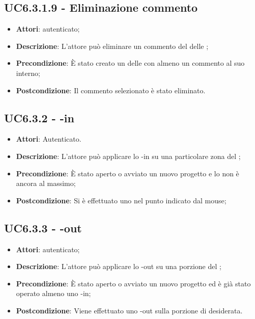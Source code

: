 \subsection{UC6.3.1.9 - Eliminazione commento}
\label{ssec:UC6.3.1.9}
\begin{itemize}
\item \textbf{Attori}:  autenticato;
\item \textbf{Descrizione}: L'attore può eliminare un commento del  delle ;
\item \textbf{Precondizione}: È stato creato un  delle  con almeno un commento al suo interno;
\item \textbf{Postcondizione}: Il commento selezionato è stato eliminato.
\end{itemize}
\subsection{UC6.3.2 - -in}
\label{ssec:UC6.3.2}
\begin{itemize}
\item \textbf{Attori}:  Autenticato.
\item \textbf{Descrizione}: L'attore può applicare lo -in su una particolare zona del ;
\item \textbf{Precondizione}: È stato aperto o avviato un nuovo progetto e lo  non è ancora al massimo;
\item \textbf{Postcondizione}: Si è effettuato uno  nel punto indicato dal mouse;
\end{itemize}
\subsection{UC6.3.3 - -out}
\label{ssec:UC6.3.3}
\begin{itemize}
\item \textbf{Attori}:  autenticato;
\item \textbf{Descrizione}: L'attore può applicare lo -out su una porzione del ;
\item \textbf{Precondizione}: È stato aperto o avviato un nuovo progetto ed è già stato operato almeno uno -in;
\item \textbf{Postcondizione}: Viene effettuato uno -out sulla porzione di  desiderata.
\end{itemize}
